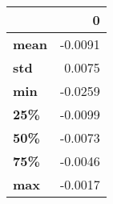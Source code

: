 \begin{tabular}{lr}
\toprule
{} &       0 \\
\midrule
\textbf{mean} & -0.0091 \\
\textbf{std } &  0.0075 \\
\textbf{min } & -0.0259 \\
\textbf{25\% } & -0.0099 \\
\textbf{50\% } & -0.0073 \\
\textbf{75\% } & -0.0046 \\
\textbf{max } & -0.0017 \\
\bottomrule
\end{tabular}
